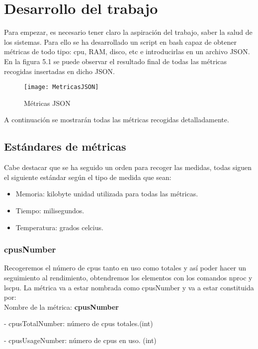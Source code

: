 \documentclass[ spanish, a4paper, 12pt, oneside]{report}
\begin{document}
\chapter{Desarrollo del trabajo}
Para empezar, es necesario tener claro la aspiración del trabajo, saber la salud de los sistemas. Para ello se ha desarrollado un script en bash capaz de obtener métricas de todo tipo: cpu, 
RAM, disco, etc e introducirlas en un archivo JSON. En la figura 5.1 se puede observar el resultado final de todas las métricas recogidas insertadas en dicho JSON. \\

\begin{figure}[!h]
   \centering
   \texttt{[image: MetricasJSON]}\\
      \caption{\label{fig: json} Métricas JSON}
\end{figure}

A continuación se mostrarán todas las métricas recogidas detalladamente.\\

\section{Estándares de métricas}

Cabe destacar que se ha seguido un orden para recoger las medidas, todas siguen el siguiente estándar según el tipo de medida que sean:
\begin{itemize}
   \item Memoria: kilobyte unidad utilizada para todas las métricas.
   \item Tiempo: milisegundos.
   \item Temperatura: grados celcius.
\end{itemize}

\subsection{cpusNumber}
Recogeremos el número de cpus tanto en uso como totales y así poder hacer un seguimiento al rendimiento, obtendremos los elementos con 
los comandos nproc y lscpu. La métrica va a estar nombrada como cpusNumber y va a estar constituida por:\\

Nombre de la métrica: \textbf{cpusNumber}

\hyp{} cpusTotalNumber: número de cpus totales.(int)

\hyp{} cpusUsageNumber: número de cpus en uso. (int)
\end{document}
